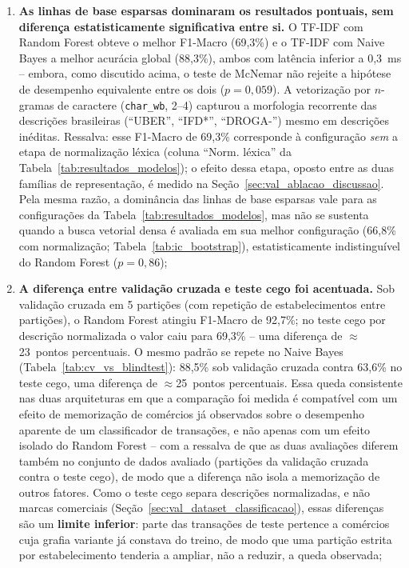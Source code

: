 \begin{enumerate}
	\item \textbf{As linhas de base esparsas dominaram os resultados pontuais, sem diferença estatisticamente significativa entre si.} O TF-IDF com Random Forest
	obteve o melhor F1-Macro (69,3\%) e o TF-IDF com Naive
	Bayes a melhor acurácia global (88,3\%), ambos com
	latência inferior a 0,3~ms -- embora, como discutido acima, o teste de McNemar não rejeite a hipótese de desempenho equivalente entre os dois ($p = 0{,}059$). A vetorização por $n$-gramas de caractere (\texttt{char\_wb},
	2--4) capturou a morfologia recorrente das descrições brasileiras (``UBER'', ``IFD*'',
	``DROGA-'') mesmo em descrições inéditas. Ressalva: esse F1-Macro de 69,3\% corresponde à configuração \textit{sem} a etapa de normalização léxica (coluna ``Norm. léxica'' da Tabela~\ref{tab:resultados_modelos}); o efeito dessa etapa, oposto entre as duas famílias de representação, é medido na Seção~\ref{sec:val_ablacao_discussao}. Pela mesma razão, a dominância das linhas de base esparsas vale para as configurações da Tabela~\ref{tab:resultados_modelos}, mas não se sustenta quando a busca vetorial densa é avaliada em sua melhor configuração (66,8\% com normalização; Tabela~\ref{tab:ic_bootstrap}), estatisticamente indistinguível do Random Forest ($p = 0{,}86$);

	\item \textbf{A diferença entre validação cruzada e teste cego foi acentuada.} Sob
	validação cruzada em 5 partições (com repetição de estabelecimentos entre partições), o Random Forest
	atingiu F1-Macro de 92,7\%; no teste cego por descrição normalizada o
	valor caiu para 69,3\% -- uma diferença de
	$\approx$23~pontos percentuais. O mesmo padrão se repete no Naive Bayes (Tabela~\ref{tab:cv_vs_blindtest}):
	88,5\% sob validação cruzada contra 63,6\% no teste cego, uma diferença de
	$\approx$25~pontos percentuais. Essa queda consistente nas duas arquiteturas em que a
	comparação foi medida é compatível com um efeito de memorização de comércios já observados sobre o desempenho aparente de um classificador de transações, e não apenas com um efeito isolado do Random Forest -- com a ressalva de que as duas avaliações diferem também no conjunto de dados avaliado (partições da validação cruzada contra o teste cego), de modo que a diferença não isola a memorização de outros fatores. Como o teste cego separa descrições normalizadas, e não marcas comerciais (Seção~\ref{sec:val_dataset_classificacao}), essas diferenças são um \textbf{limite inferior}: parte das transações de teste pertence a comércios cuja grafia variante já constava do treino, de modo que uma partição estrita por estabelecimento tenderia a ampliar, não a reduzir, a queda observada;


\end{enumerate}
